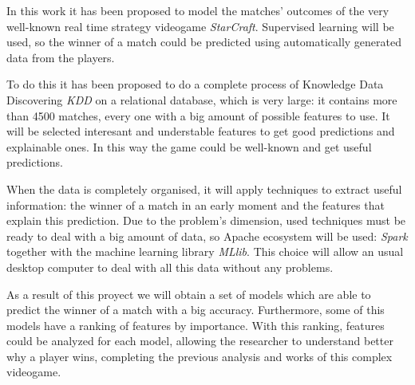 %
%

In this work it has been proposed to model the matches' outcomes of the very
well-known real time strategy videogame \emph{StarCraft}. Supervised learning
will be used, so the winner of a match could be predicted using automatically
generated data from the players.

To do this it has been proposed to do a complete process of Knowledge Data
Discovering \emph{KDD} on a relational database, which is very large: it
contains more than 4500 matches, every one with a big amount of possible
features to use. It will be selected interesant and understable features to
get good predictions and explainable ones. In this way the game could be
well-known and get useful predictions.

When the data is completely organised, it will apply techniques to extract
useful information: the winner of a match in an early moment and the features
that explain this prediction. Due to the problem's dimension, used techniques
must be ready to deal with a big amount of data, so Apache ecosystem will
be used: \emph{Spark} together with the machine learning library \emph{MLlib}.
This choice will allow an usual desktop computer to deal with all this data
without any problems.

As a result of this proyect we will obtain a set of models which are able to
predict the winner of a match with a big accuracy. Furthermore, some of this
models have a ranking of features by importance. With this ranking, features
could be analyzed for each model, allowing the researcher to understand better
why a player wins, completing the previous analysis and works of this complex
videogame.
